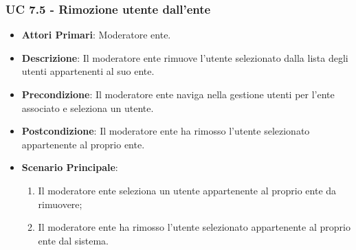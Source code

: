 			\subsubsection{UC 7.5 - Rimozione utente dall'ente}
			\begin{itemize}
				\item \textbf{Attori Primari}: Moderatore ente.
				\item \textbf{Descrizione}: Il moderatore ente rimuove l'utente selezionato dalla lista degli utenti appartenenti al suo ente.
				\item \textbf{Precondizione}: Il moderatore ente naviga nella gestione utenti per l'ente associato e seleziona un utente.
				\item \textbf{Postcondizione}: Il moderatore ente ha rimosso l'utente selezionato appartenente al proprio ente.
				\item \textbf{Scenario Principale}:
				\begin{enumerate}
					\item{Il moderatore ente seleziona un utente appartenente al proprio ente da rimuovere;}
					\item{Il moderatore ente ha rimosso l'utente selezionato appartenente al proprio ente dal sistema.}
				\end{enumerate}		
			\end{itemize}
